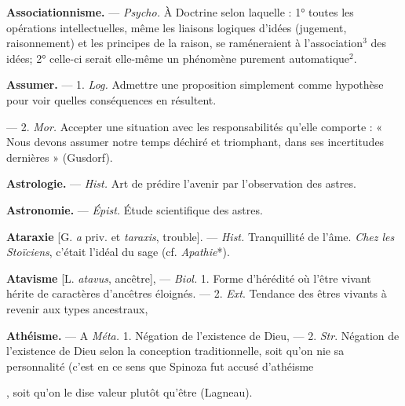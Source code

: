 \begin{itemize}[leftmargin=1cm, label=, itemsep=1pt]
{{{{\item {\bf Associationnisme.} — \textsf{\textit {Psycho.}} À Doctrine selon laquelle : 1° toutes les
opérations intellectuelles, même les
liaisons logiques d'idées (jugement,
raisonnement) et les principes de la
raison, se raméneraient à l’association$^3$ des idées; 2° celle-ci serait
elle-même un phénomène purement
automatique$^2$.

\item {\bf Assumer.} — 1. \textsf{\textit {Log.}} Admettre une
proposition simplement comme hypothèse pour voir quelles
conséquences en résultent.

— 2. \textsf{\textit {Mor.}} Accepter une situation avec les responsabilités qu'elle
comporte : « Nous devons assumer
notre temps déchiré et triomphant,
dans ses incertitudes dernières »
(Gusdorf).

\item {\bf Astrologie.} — \textsf{\textit {Hist.}} Art de prédire
l'avenir par l’observation des astres.

\item {\bf Astronomie.} — \textsf{\textit {Épist.}} Étude scientifique des astres.

\item {\bf Ataraxie} [G. {\it a} priv. et {\it taraxis}, trouble]. — \textsf{\textit {Hist.}} Tranquillité de l'âme.
{\it Chez les Stoïciens}, c'était l'idéal du
sage (cf. {\it Apathie}*).

\item {\bf Atavisme} [L. {\it atavus}, ancêtre], —
\textsf{\textit {Biol.}} 1. Forme d’hérédité où l'être
vivant hérite de caractères d’ancêtres éloignés. — 2. {\it Ext}. Tendance
des êtres vivants à revenir aux types
ancestraux,

\item {\bf Athéisme.} — A \textsf{\textit {Méta.}} 1. Négation de
l'existence de Dieu, — 2. {\it Str}. Négation de l'existence de Dieu selon la
conception traditionnelle, soit qu’on
nie sa personnalité (c'est en ce sens
que Spinoza fut accusé d’athéisme},
soit qu’on le dise valeur plutôt
qu'être (Lagneau).

}}}
\end{itemize}
